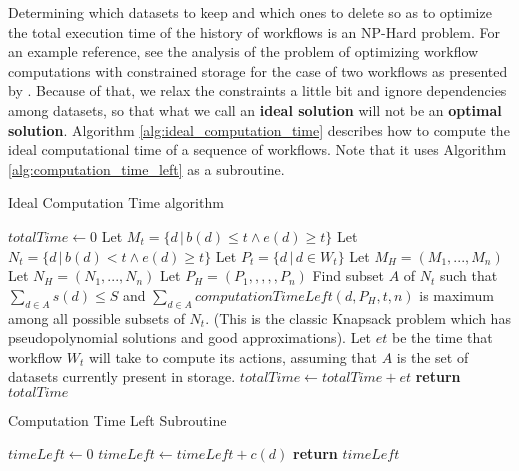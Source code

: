 Determining which datasets to keep and which ones to delete so as to optimize the total execution time of the history of workflows is an NP-Hard problem.  For an example reference, see the analysis of the problem of optimizing workflow computations with constrained storage for the case of two workflows as presented by \cite{zohrevandi2013bounded}.  Because of that, we relax the constraints a little bit and ignore dependencies among datasets, so that what we call an \textbf{ideal solution} will not be an \textbf{optimal solution}.  Algorithm \ref{alg:ideal_computation_time} describes how to compute the ideal computational time of a sequence of workflows.  Note that it uses Algorithm \ref{alg:computation_time_left} as a subroutine.

\begin{algorithm}
\begin{singlespace}
\caption{Ideal Computation Time algorithm}
\label{alg:ideal_computation_time}
\begin{algorithmic}[1]
	\State $totalTime \gets 0$
		\State Let $M_t = \{ d\, |\, b(d) \leq t \wedge e(d) \geq t \}$
		\State Let $N_t = \{ d\, |\, b(d) < t \wedge e(d) \geq t \}$ 
		\State Let $P_t = \{ d\, |\, d \in W_t \}$ 
	\EndFor
	\State Let $M_H = (M_1, ..., M_n)$
	\State Let $N_H = (N_1, ..., N_n)$
	\State Let $P_H = (P_1, ,,,, P_n)$
		\State Find subset $A$ of $N_t$ such that $\sum_{d \in A}{s(d)} \leq S$ and $\sum_{d \in A}{computationTimeLeft(d, P_H, t, n)}$ is maximum among all possible subsets of $N_t$.  (This is the classic Knapsack problem which has pseudopolynomial solutions and good approximations).
		\State Let $et$ be the time that workflow $W_t$ will take to compute its actions, assuming that $A$ is the set of datasets currently present in storage.
		\State $totalTime \gets totalTime + et$
	\EndFor
	\State \textbf{return} $totalTime$
\EndProcedure
\end{algorithmic}
\end{singlespace}
\end{algorithm}

\begin{algorithm}
\begin{singlespace}
\caption{Computation Time Left Subroutine}
\label{alg:computation_time_left}
\begin{algorithmic}[1]
	\State $timeLeft \gets 0$
			\State $timeLeft \gets timeLeft + c(d)$
		\EndIf
	\EndFor
	\State \textbf{return} $timeLeft$
\EndProcedure
\end{algorithmic}
\end{singlespace}
\end{algorithm}

